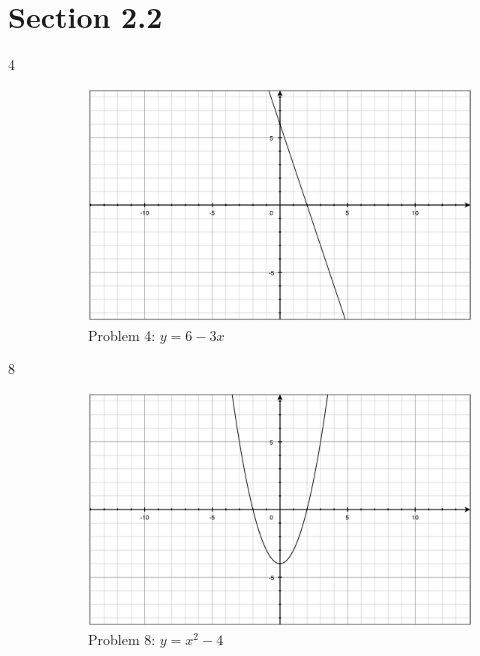 \documentclass{exam}
\begin{document}
  \pagebreak

  \section{Section 2.2}

  \begin{description}
    \item[4]
      \begin{figure}[H]
        \centering
        \includegraphics[scale=.3]{section_2.2/problem4.eps}
        \caption*{Problem 4: $y = 6 - 3x$}
      \end{figure}

    \item[8]
      \begin{figure}[H]
        \centering
        \includegraphics[scale=.3]{section_2.2/problem8.eps}
        \caption*{Problem 8: $y = x^2 - 4$}
      \end{figure}


\end{description}
\end{document}

